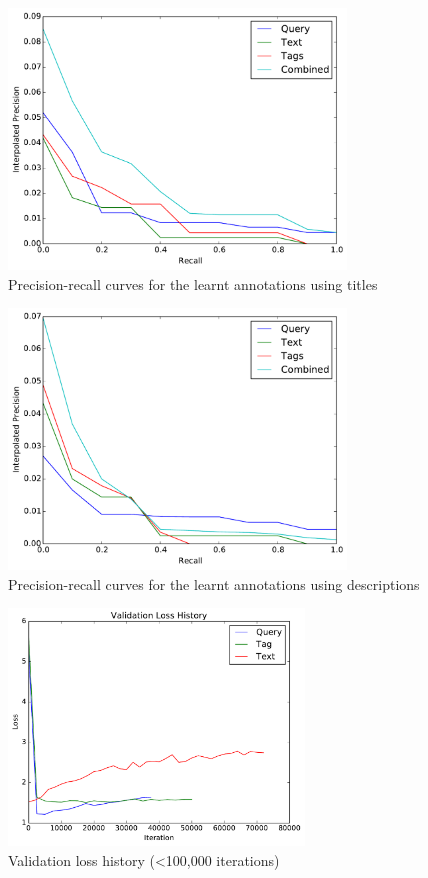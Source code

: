 \begin{figure}[ht]
    \centering
    \includegraphics[width=0.8\textwidth]{graphs/auto-title}
    \caption{Precision-recall curves for the learnt annotations using titles}
    \label{fig:auto-result-title}
\end{figure}

\begin{figure}[ht]
    \centering
    \includegraphics[width=0.8\textwidth]{graphs/auto-desc}
    \caption{Precision-recall curves for the learnt annotations using descriptions}
    \label{fig:auto-result-desc}
\end{figure}

\begin{figure}
    \centering
    \includegraphics[width=0.7\textwidth]{graphs/initial-validation-loss-history}
    \caption{Validation loss history (\textless 100,000 iterations)}
    \label{fig:val-loss-1}
\end{figure}

